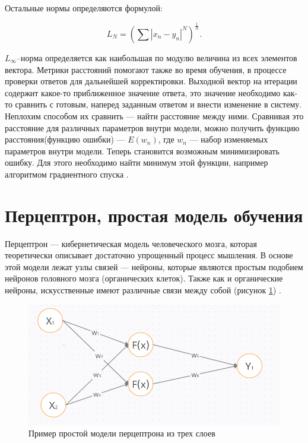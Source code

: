 	
Остальные нормы определяются формулой: 

\begin{equation}
L_{N} = (\sum |x_{n}-y_{n}|^N)^\frac{1}{N}.
\end{equation}

	
$L_{\infty}$--норма определяется как наибольшая по модулю величина из всех элементов вектора.
Метрики расстояний помогают также во время обучения, в процессе проверки ответов для дальнейшей корректировки. Выходной вектор на итерации содержит какое-то приближенное значение ответа, это значение необходимо как-то сравнить с готовым, наперед заданным ответом и внести изменение в систему. Неплохим способом их сравнить — найти расстояние между ними. Сравнивая это расстояние для различных параметров внутри модели, можно получить функцию расстояния(функцию ошибки) — $E(w_{n})$, где $w_{n}$ — набор изменяемых параметров внутри модели. Теперь становится возможным минимизировать ошибку. Для этого необходимо найти минимум этой функции, например алгоритмом градиентного спуска \cite{5, 7}.


\section{Перцептрон, простая модель обучения}


Перцептрон — кибернетическая модель человеческого мозга, которая теоретически описывает достаточно упрощенный процесс мышления. В основе этой модели лежат узлы связей — нейроны, которые являются простым подобием нейронов головного мозга (органических клеток). Также как и органические нейроны, искусственные имеют различные связи между собой (рисунок \ref{fig:1}) \cite{3,9}. 

\begin{figure}[ht] 
  \center
  \includegraphics [scale=0.7] {img/Perceptron.png}
  \caption{Пример простой модели перцептрона из трех слоев} 
  \label{fig:1}  
\end{figure}

